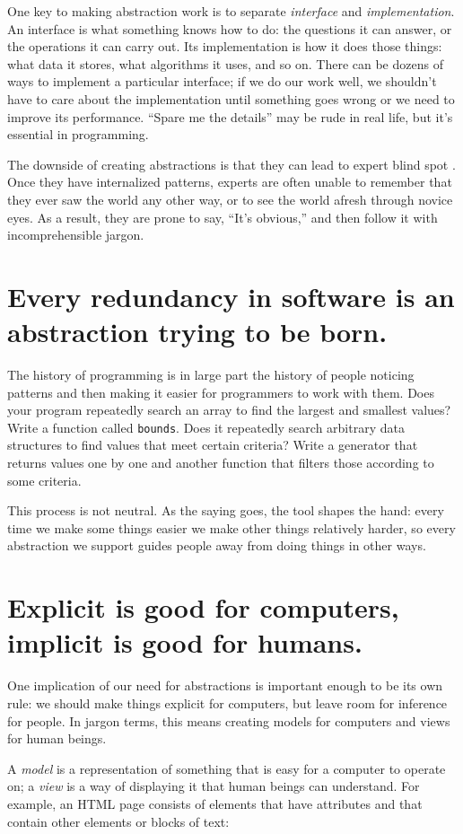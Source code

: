 \documentclass[10pt,letterpaper]{article}
\newcommand{\rulemajor}[1]{\section{#1}}
\begin{document}
One key to making abstraction work is to separate \emph{interface} and
\emph{implementation}.  An interface is what something knows how to do: the
questions it can answer, or the operations it can carry out. Its implementation
is how it does those things: what data it stores, what algorithms it uses, and
so on.  There can be dozens of ways to implement a particular interface; if we
do our work well, we shouldn't have to care about the implementation until
something goes wrong or we need to improve its performance.  ``Spare me the
details'' may be rude in real life, but it's essential in programming.

The downside of creating abstractions is that they can lead to expert blind spot
\cite{Nath2003}.  Once they have internalized patterns, experts are often unable
to remember that they ever saw the world any other way, or to see the world
afresh through novice eyes.  As a result, they are prone to say, ``It's
obvious,'' and then follow it with incomprehensible jargon.

\rulemajor{Every redundancy in software is an abstraction trying to be born.}

The history of programming is in large part the history of people noticing
patterns and then making it easier for programmers to work with them.  Does your
program repeatedly search an array to find the largest and smallest values?
Write a function called \texttt{bounds}.  Does it repeatedly search arbitrary
data structures to find values that meet certain criteria?  Write a generator
that returns values one by one and another function that filters those according
to some criteria.

This process is not neutral.  As the saying goes, the tool shapes the hand:
every time we make some things easier we make other things relatively harder, so
every abstraction we support guides people away from doing things in other ways.

\rulemajor{Explicit is good for computers, implicit is good for humans.}

One implication of our need for abstractions is important enough to be its own
rule: we should make things explicit for computers, but leave room for inference
for people.  In jargon terms, this means creating models for computers and views
for human beings.

A \emph{model} is a representation of something that is easy for a computer to
operate on; a \emph{view} is a way of displaying it that human beings can
understand.  For example, an HTML page consists of elements that have attributes
and that contain other elements or blocks of text:
\end{document}
